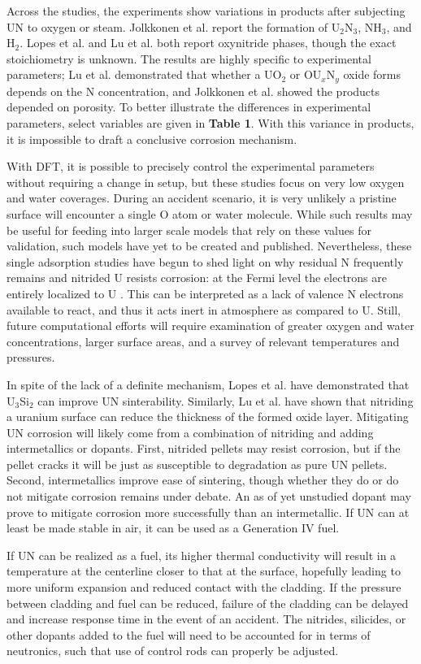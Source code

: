 \documentclass[3p,review,11pt]{elsarticle}
\begin{document}
Across the studies, the experiments show variations in products after subjecting UN to oxygen or steam. Jolkkonen et al. report the formation of U$_{2}$N$_{3}$, NH$_{3}$, and H$_{2}$. Lopes et al. and Lu et al. both report oxynitride phases, though the exact stoichiometry is unknown. The results are highly specific to experimental parameters; Lu et al. demonstrated that whether a UO$_{2}$ or  OU$_{x}$N$_{y}$ oxide forms depends on the N concentration, and Jolkkonen et al. showed the products depended on porosity. To better illustrate the differences in experimental parameters, select variables are given in \textbf{Table 1}. With this variance in products, it is impossible to draft a conclusive corrosion mechanism.
\par With DFT, it is possible to precisely control the experimental parameters without requiring a change in setup, but these studies focus on very low oxygen and water coverages. During an accident scenario, it is very unlikely a pristine surface will encounter a single O atom or water molecule. While such results may be useful for feeding into larger scale models that rely on these values for validation,  such models have yet to be created and published. Nevertheless, these single adsorption studies have begun to shed light on why residual N frequently remains and nitrided U resists corrosion: at the Fermi level the electrons are entirely localized to U \cite{Bo2016}. This can be interpreted as a lack of valence N electrons available to react, and thus it acts inert in atmosphere as compared to U. Still, future computational efforts will require examination of greater oxygen and water concentrations, larger surface areas, and a survey of relevant temperatures and pressures. 
\par 
In spite of the lack of a definite mechanism, Lopes et al. \cite{Lopes2017} have demonstrated that U$_{3}$Si$_{2}$ can improve UN sinterability. Similarly, Lu et al. \cite{Lu2016} have shown that nitriding a uranium surface can reduce the thickness of the formed oxide layer.
Mitigating UN corrosion will likely come from a combination of nitriding and adding intermetallics or dopants. First, nitrided pellets may resist corrosion, but if the pellet cracks it will be just as susceptible to degradation as pure UN pellets. Second, intermetallics improve ease of sintering, though whether they do or do not mitigate corrosion remains under debate. An as of yet unstudied dopant may prove to mitigate corrosion more successfully than an intermetallic. If UN can at least be made stable in air, it can be used as a Generation IV fuel.
\par 
If UN can be realized as a fuel, its higher thermal conductivity will result in a temperature at the centerline closer to that at the surface, hopefully leading to more uniform expansion and reduced contact with the cladding. If the pressure between cladding and fuel can be reduced, failure of the cladding can be delayed and increase response time in the event of an accident. The nitrides, silicides, or other dopants added to the fuel will need to be accounted for in terms of neutronics, such that use of control rods can properly be adjusted.
\end{document}
